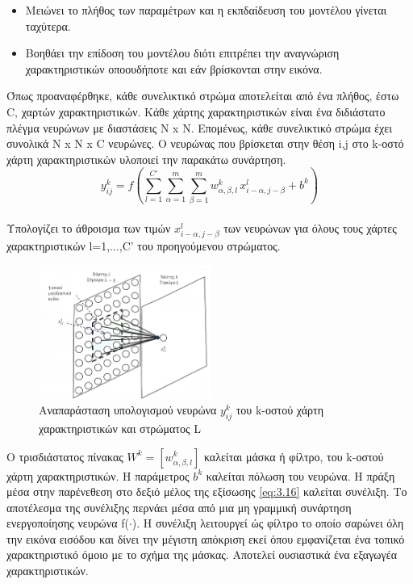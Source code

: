 \documentclass[12pt]{article}
\numberwithin{equation}{section}
\begin{document}
\begin{itemize}
  \item Μειώνει το πλήθος των παραμέτρων και η εκπδαίδευση του μοντέλου γίνεται ταχύτερα.
  \item Βοηθάει την επίδοση του μοντέλου διότι επιτρέπει την αναγνώριση χαρακτηριστικών οποουδήποτε και εάν βρίσκονται στην εικόνα.
\end{itemize}


Όπως προαναφέρθηκε, κάθε συνελικτικό στρώμα αποτελείται από ένα πλήθος, έστω C, χαρτών χαρακτηριστικών. Κάθε χάρτης χαρακτηριστικών είναι ένα διδιάστατο πλέγμα νευρώνων με διαστάσεις N x N. Επομένως, κάθε συνελικτικό στρώμα έχει συνολικά N x N x C  νευρώνες. Ο νευρώνας που βρίσκεται στην θέση i,j στο k-οστό χάρτη χαρακτηριστικών υλοποιεί την παρακάτω συνάρτηση. \\

\begin{equation}
y_{ij}^{k} = f\left( \sum_{l=1}^{C'} \sum_{\alpha=1}^{m} \sum_{\beta=1}^{m} w_{\alpha, \beta,l}^{k} \, x_{i - \alpha, j - \beta}^{l} + b^{k} \right)
\label{eq:3.16}
\end{equation}\\

Υπολογίζει το άθροισμα των τιμών \(x_{i-\alpha,j-\beta}^{l}\) των νευρώνων για όλους τους χάρτες χαρακτηριστικών l=1,...,C' του προηγούμενου στρώματος. 

\begin{figure}[h!]
  \centering
  \includegraphics[width=0.5\textwidth]{images/Rec_field.png} %
  \caption{Αναπαράσταση υπολογισμού νευρώνα \(y_{ij}^{k}\) του k-οστού χάρτη χαρακτηριστικών και στρώματος L}
  \label{figure 19}
\end{figure} 

Ο τρισδιάστατος πίνακας \(W^{k} = [w_{\alpha,\beta,l}^{k}]\) καλείται μάσκα ή φίλτρο, του k-οστού χάρτη χαρακτηριστικών. Η παράμετρος \(b^{k}\) καλείται πόλωση του νευρώνα. Η πράξη μέσα στην παρένεθεση στο δεξιό μέλος της εξίσωσης \eqref{eq:3.16} καλείται συνέλιξη. Το αποτέλεσμα της συνέλιξης περνάει μέσα από μια μη γραμμική συνάρτηση ενεργοποίησης νευρώνα f(\(\cdot\)). Η συνέλιξη λειτουργεί ώς φίλτρο το οποίο σαρώνει όλη την εικόνα εισόδου και δίνει την μέγιστη απόκριση εκεί όπου εμφανίζεται ένα τοπικό χαρακτηριστικό όμοιο με το σχήμα της μάσκας. Αποτελεί ουσιαστικά ένα εξαγωγέα χαρακτηριστικών.
\end{document}
